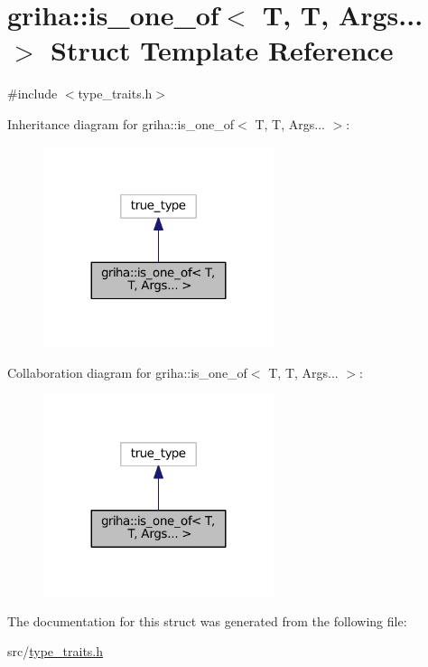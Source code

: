 \hypertarget{structgriha_1_1is__one__of_3_01_t_00_01_t_00_01_args_8_8_8_01_4}{}\section{griha\+:\+:is\+\_\+one\+\_\+of$<$ T, T, Args... $>$ Struct Template Reference}
\label{structgriha_1_1is__one__of_3_01_t_00_01_t_00_01_args_8_8_8_01_4}


{\ttfamily \#include $<$type\+\_\+traits.\+h$>$}



Inheritance diagram for griha\+:\+:is\+\_\+one\+\_\+of$<$ T, T, Args... $>$\+:
\nopagebreak
\begin{figure}[H]
\begin{center}
\leavevmode
\includegraphics[width=191pt]{structgriha_1_1is__one__of_3_01_t_00_01_t_00_01_args_8_8_8_01_4__inherit__graph}
\end{center}
\end{figure}


Collaboration diagram for griha\+:\+:is\+\_\+one\+\_\+of$<$ T, T, Args... $>$\+:
\nopagebreak
\begin{figure}[H]
\begin{center}
\leavevmode
\includegraphics[width=191pt]{structgriha_1_1is__one__of_3_01_t_00_01_t_00_01_args_8_8_8_01_4__coll__graph}
\end{center}
\end{figure}


The documentation for this struct was generated from the following file\+:\begin{DoxyCompactItemize}
\item 
src/\hyperlink{type__traits_8h}{type\+\_\+traits.\+h}\end{DoxyCompactItemize}
